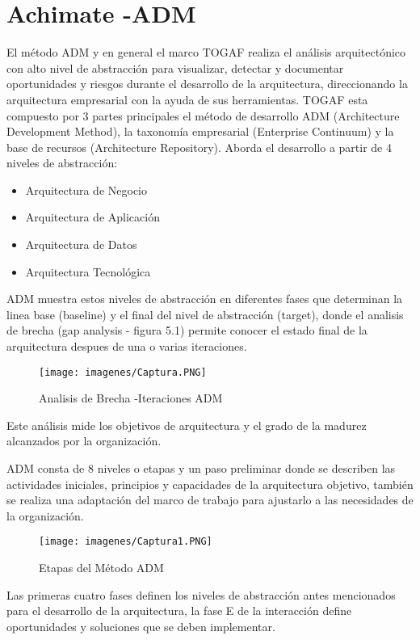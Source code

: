 \chapter{Achimate -ADM}

El método ADM y en general el marco TOGAF realiza el análisis arquitectónico con alto nivel de abstracción para visualizar, detectar y
	documentar oportunidades y riesgos durante el desarrollo de la arquitectura, direccionando la arquitectura empresarial con la ayuda de sus herramientas.
TOGAF esta compuesto por 3 partes principales el método de desarrollo ADM (Architecture Development Method), la taxonomía empresarial (Enterprise Continuum) y la base de recursos (Architecture Repository). Aborda el desarrollo a partir de 4 niveles de abstracción:
\begin{itemize}
	\item Arquitectura de Negocio
	\item Arquitectura de Aplicación
	\item Arquitectura de Datos
	\item Arquitectura Tecnológica
\end{itemize}
ADM muestra estos niveles de abstracción en diferentes fases que determinan la linea base (baseline) y el final del nivel de abstracción (target), donde el analisis de brecha (gap analysis - figura 5.1) permite conocer el estado final de la arquitectura despues de una o varias iteraciones.
\begin{figure}[h]
	\centering
	\texttt{[image: imagenes/Captura.PNG]}
	\caption{Analisis de Brecha -Iteraciones ADM}
	\label{fig:gap_analysis}
\end{figure}

Este análisis mide los objetivos de arquitectura y el grado de la madurez alcanzados por la organización.

ADM consta de 8  niveles o etapas y un paso preliminar donde se describen las actividades iniciales, principios y capacidades de la arquitectura objetivo, también se realiza una adaptación del marco de trabajo para ajustarlo a las necesidades de la organización.
\cite{FGuti}

\begin{figure}[h]
	\centering
	\texttt{[image: imagenes/Captura1.PNG]}
	\caption{Etapas del Método ADM}
	\label{fig:gap_analysis}
\end{figure}

Las primeras cuatro fases definen los niveles de abstracción antes mencionados para el desarrollo de la arquitectura, la fase E de la interacción define oportunidades y soluciones que se deben implementar.

